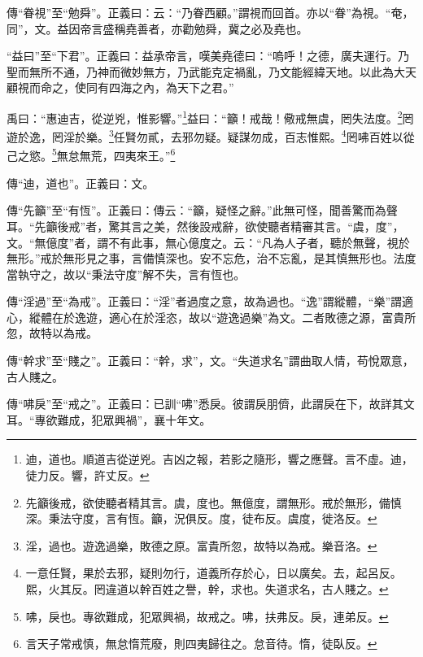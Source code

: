 {\noindent\zhuan{}\fzbyks 傳“眷視”至“勉舜”。正義曰：云：“乃眷西顧。”謂視而回首。亦以“眷”為視。“奄，同”，文。益因帝言盛稱堯善者，亦勸勉舜，冀之必及堯也。 \par}

{\noindent\shu{}\fzkt “益曰”至“下君”。正義曰：益承帝言，嘆美堯德曰：“嗚呼！之德，廣夫運行。乃聖而無所不通，乃神而微妙無方，乃武能克定禍亂，乃文能經緯天地。以此為大天顧視而命之，使同有四海之內，為天下之君。” \par}

禹曰：“惠迪吉，從逆兇，惟影響。”\footnote{迪，道也。順道吉從逆兇。吉凶之報，若影之隨形，響之應聲。言不虛。迪，徒力反。響，許丈反。}益曰：“籲！戒哉！儆戒無虞，罔失法度。\footnote{先籲後戒，欲使聽者精其言。虞，度也。無億度，謂無形。戒於無形，備慎深。秉法守度，言有恆。籲，況俱反。度，徒布反。虞度，徙洛反。}罔遊於逸，罔淫於樂。\footnote{淫，過也。遊逸過樂，敗德之原。富貴所忽，故特以為戒。樂音洛。}任賢勿貳，去邪勿疑。疑謀勿成，百志惟熙。\footnote{一意任賢，果於去邪，疑則勿行，道義所存於心，日以廣矣。去，起呂反。熙，火其反。罔違道以幹百姓之譽，幹，求也。失道求名，古人賤之。}罔咈百姓以從己之慾。\footnote{咈，戾也。專欲難成，犯眾興禍，故戒之。咈，扶弗反。戾，連弟反。}無怠無荒，四夷來王。”\footnote{言天子常戒慎，無怠惰荒廢，則四夷歸往之。怠音待。惰，徒臥反。}

{\noindent\zhuan{}\fzbyks 傳“迪，道也”。正義曰：文。 \par}

{\noindent\zhuan{}\fzbyks 傳“先籲”至“有恆”。正義曰：傳云：“籲，疑怪之辭。”此無可怪，聞善驚而為聲耳。“先籲後戒”者，驚其言之美，然後設戒辭，欲使聽者精審其言。“虞，度”，文。“無億度”者，謂不有此事，無心億度之。云：“凡為人子者，聽於無聲，視於無形。”戒於無形見之事，言備慎深也。安不忘危，治不忘亂，是其慎無形也。法度當執守之，故以“秉法守度”解不失，言有恆也。 \par}

{\noindent\zhuan{}\fzbyks 傳“淫過”至“為戒”。正義曰：“淫”者過度之意，故為過也。“逸”謂縱體，“樂”謂適心，縱體在於逸遊，適心在於淫恣，故以“遊逸過樂”為文。二者敗德之源，富貴所忽，故特以為戒。 \par}

{\noindent\zhuan{}\fzbyks 傳“幹求”至“賤之”。正義曰：“幹，求”，文。“失道求名”謂曲取人情，苟悅眾意，古人賤之。 \par}

{\noindent\zhuan{}\fzbyks 傳“咈戾”至“戒之”。正義曰：已訓“咈”悉戾。彼謂戾朋儕，此謂戾在下，故詳其文耳。“專欲難成，犯眾興禍”，襄十年文。 \par}

